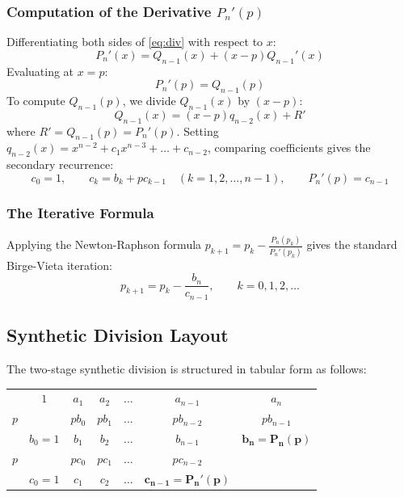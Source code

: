 \documentclass[11pt,a4paper]{article}
\begin{document}
\subsubsection{Computation of the Derivative \texorpdfstring{$P_n'(p)$}{P'_n(p)}}
Differentiating both sides of \eqref{eq:div} with respect to $x$:
\begin{equation}
    P_n'(x) = Q_{n-1}(x) + (x - p) Q_{n-1}'(x)
\end{equation}
Evaluating at $x = p$:
\begin{equation}
    P_n'(p) = Q_{n-1}(p)
\end{equation}
To compute $Q_{n-1}(p)$, we divide $Q_{n-1}(x)$ by $(x - p)$:
\begin{equation}
    Q_{n-1}(x) = (x - p) q_{n-2}(x) + R'
\end{equation}
where $R' = Q_{n-1}(p) = P_n'(p)$. Setting $q_{n-2}(x) = x^{n-2} + c_1 x^{n-3} + \dots + c_{n-2}$, comparing coefficients gives the secondary recurrence:
\begin{equation}
    \boxed{c_0 = 1, \qquad c_k = b_k + p c_{k-1} \quad (k = 1, 2, \dots, n-1), \qquad P_n'(p) = c_{n-1}}
\end{equation}

\subsubsection{The Iterative Formula}
Applying the Newton-Raphson formula $p_{k+1} = p_k - \frac{P_n(p_k)}{P_n'(p_k)}$ gives the standard Birge-Vieta iteration:
\begin{equation}
    \boxed{p_{k+1} = p_k - \frac{b_n}{c_{n-1}}, \qquad k = 0, 1, 2, \dots}
\end{equation}

\subsection{Synthetic Division Layout}
The two-stage synthetic division is structured in tabular form as follows:
\begin{center}
\begin{tabular}{c|cccccc}
    & $1$ & $a_1$ & $a_2$ & $\dots$ & $a_{n-1}$ & $a_n$ \\
    $p$ & & $p b_0$ & $p b_1$ & $\dots$ & $p b_{n-2}$ & $p b_{n-1}$ \\
    \hline
    & $b_0=1$ & $b_1$ & $b_2$ & $\dots$ & $b_{n-1}$ & $\mathbf{b_n = P_n(p)}$ \\
    $p$ & & $p c_0$ & $p c_1$ & $\dots$ & $p c_{n-2}$ & \\
    \hline
    & $c_0=1$ & $c_1$ & $c_2$ & $\dots$ & $\mathbf{c_{n-1} = P_n'(p)}$ &
\end{tabular}
\end{center}
\end{document}
